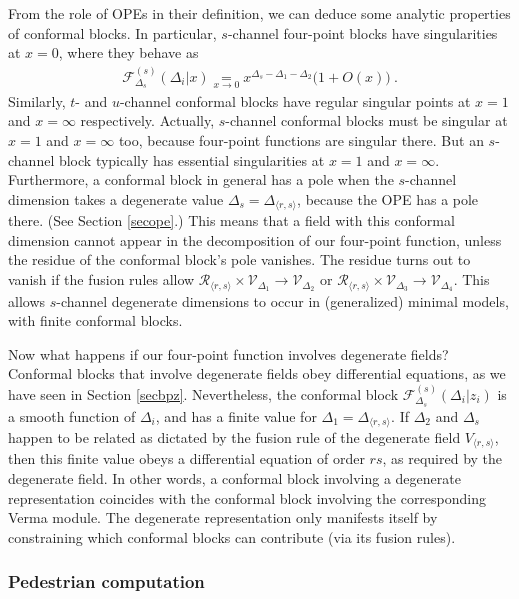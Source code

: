 \documentclass[12pt, a4paper, notitlepage, twoside]{report}
\numberwithin{equation}{section}
\theoremstyle{break}
\begin{document}
From the role of OPEs in their definition, we can deduce some analytic properties of conformal blocks. In particular, $s$-channel four-point blocks have singularities at $x=0$, where they behave as 
\begin{align}
 \mathcal{F}^{(s)}_{\Delta_s}(\Delta_i|x) \underset{x\to 0}{=} x^{\Delta_s-\Delta_1-\Delta_2}\Big( 1+ O(x)\Big)\ .
\end{align}
Similarly, $t$- and $u$-channel conformal blocks have regular singular points at $x=1$ and $x=\infty$ respectively. Actually, $s$-channel conformal blocks must be singular at $x=1$ and $x=\infty$ too, because four-point functions are singular there. But an $s$-channel block typically has essential singularities at $x=1$ and $x=\infty$. 
Furthermore, a conformal block in general has a pole when the $s$-channel dimension takes a degenerate value $\Delta_s=\Delta_{\langle r,s\rangle}$, because the OPE has a pole there. (See Section \ref{secope}.) 
This means that a field with this conformal dimension cannot appear in the decomposition of our four-point function, unless the residue of the conformal block's pole vanishes. The residue turns out to vanish if the fusion rules allow $\mathcal{R}_{\langle r,s \rangle}\times \mathcal{V}_{\Delta_1}\to \mathcal{V}_{\Delta_2}$ or $\mathcal{R}_{\langle r,s \rangle}\times \mathcal{V}_{\Delta_3}\to \mathcal{V}_{\Delta_4}$. This allows $s$-channel degenerate dimensions to occur in  (generalized) minimal models, with finite conformal blocks.

Now what happens if our four-point function involves degenerate fields? Conformal blocks that involve degenerate fields obey differential equations, as we have seen in Section \ref{secbpz}.
Nevertheless, the conformal block $\mathcal{F}^{(s)}_{\Delta_s}(\Delta_i|z_i)$ is a smooth function of $\Delta_i$, and has a finite value for $\Delta_1 = \Delta_{\langle r,s\rangle}$. 
If $\Delta_2$ and $\Delta_s$ happen to be related as dictated by the fusion rule of the degenerate field $V_{\langle r,s\rangle}$, then this finite value obeys a differential equation of order $rs$, as required by the degenerate field.
In other words, a conformal block involving a degenerate representation coincides with the conformal block involving the corresponding Verma module.
The degenerate representation only manifests itself by constraining which conformal blocks can contribute (via its fusion rules).


\subsubsection{Pedestrian computation}
\end{document}
